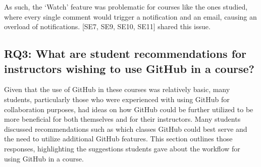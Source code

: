 As such, the `Watch' feature was problematic for courses like the ones studied, where every single comment would trigger a notification and an email, causing an overload of notifications. [SE7, SE9, SE10, SE11] shared this issue.







\subsection{RQ3: What are student recommendations for instructors wishing to use GitHub in a course?}

Given that the use of GitHub in these courses was relatively basic, many students, particularly those who were experienced with using GitHub for collaboration purposes, had ideas on how GitHub could be further utilized to be more beneficial for both themselves and for their instructors. Many students discussed recommendations such as which classes GitHub could best serve and the need to utilize additional GitHub features. This section outlines those responses, highlighting the suggestions students gave about the workflow for using GitHub in a course. \\


